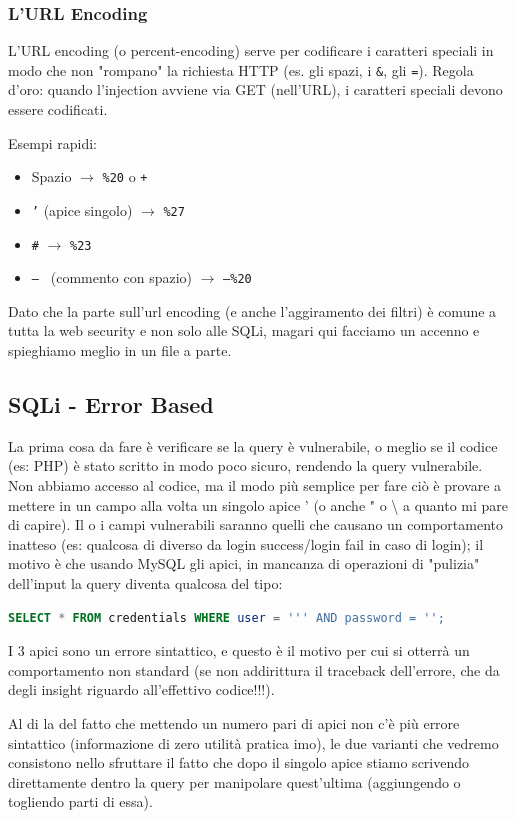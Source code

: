 \documentclass[12pt,a4paper]{report}
\begin{document}
	\subsubsection{L'URL Encoding}
	L'URL encoding (o percent-encoding) serve per codificare i caratteri speciali in modo che non "rompano" la richiesta HTTP (es. gli spazi, i \texttt{\&}, gli \texttt{=}). Regola d'oro: quando l'injection avviene via GET (nell'URL), i caratteri speciali devono essere codificati.
	
	Esempi rapidi:
	\begin{itemize}
		\item Spazio $\rightarrow$ \texttt{\%20} o \texttt{+}
		\item \texttt{'} (apice singolo) $\rightarrow$ \texttt{\%27}
		\item \texttt{\#} $\rightarrow$ \texttt{\%23}
		\item \texttt{-- } (commento con spazio) $\rightarrow$ \texttt{--\%20}
	\end{itemize}
	Dato che la parte sull'url encoding (e anche l'aggiramento dei filtri) è comune a tutta la web security e non solo alle SQLi, magari qui facciamo un accenno e spieghiamo meglio in un file a parte.
	
	\subsection{SQLi - Error Based}
	La prima cosa da fare è verificare se la query è vulnerabile, o meglio se il codice (es: PHP) è stato scritto in modo poco sicuro, rendendo la query vulnerabile. Non abbiamo accesso al codice, ma il modo più semplice per fare ciò è provare a mettere in un campo alla volta un singolo apice ' (o anche " o \textbackslash{} a quanto mi pare di capire). Il o i campi vulnerabili saranno quelli che causano un comportamento inatteso (es: qualcosa di diverso da login success/login fail in caso di login); il motivo è che usando MySQL gli apici, in mancanza di operazioni di "pulizia" dell'input la query diventa qualcosa del tipo: 
	\begin{lstlisting}[language=SQL]
		SELECT * FROM credentials WHERE user = ''' AND password = '';
	\end{lstlisting}
	I 3 apici sono un errore sintattico, e questo è il motivo per cui si otterrà un comportamento non standard (se non addirittura il traceback dell'errore, che da degli insight riguardo all'effettivo codice!!!).
	
	Al di la del fatto che mettendo un numero pari di apici non c'è più errore sintattico (informazione di zero utilità pratica imo), le due varianti che vedremo consistono nello sfruttare il fatto che dopo il singolo apice stiamo scrivendo direttamente dentro la query per manipolare quest'ultima (aggiungendo o togliendo parti di essa).
	
\end{document}
